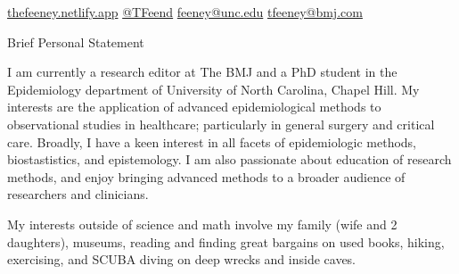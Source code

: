 \documentclass{resume} %
\begin{document}
%

\begin{center} 
 \href{https://thefeeney.netlify.app}{thefeeney.netlify.app}
 \hfill
 \href{https://twitter.com/TFeend}{@TFeend}
  \hfill
  \href{mailto:feeney@unc.edu}{feeney@unc.edu}
  \hfill
  \href{mailto:tfeeney@bmj.com}{tfeeney@bmj.com}
  \hfill
  \end{center}

\begin{rSection}{Brief Personal Statement}

{I am currently a research editor at The BMJ and a PhD student in the Epidemiology department of University of North Carolina, Chapel Hill. My interests are the application of advanced epidemiological methods to observational studies in healthcare; particularly in general surgery and critical care. Broadly, I have a keen interest in all facets of epidemiologic methods, biostastistics, and epistemology. I am also passionate about education of research methods, and enjoy bringing advanced methods to a broader audience of researchers and clinicians.

My interests outside of science and math involve my family (wife and 2 daughters), museums, reading and finding great bargains on used books, hiking, exercising, and SCUBA diving on deep wrecks and inside caves.}

\end{rSection}
\end{document}
